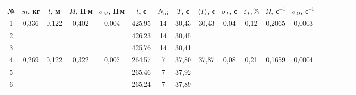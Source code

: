 \documentclass[a4paper,12pt]{article} %
\begin{document}
\begin{table}[H]
	\centering
	\begin{tabular}{|c|c|c|c|c|c|c|c|c|c|c|c|c|c|c|c|c|c|}
		\hline
		№  & $ m $, кг          & $ l $, м            & $ M $, Н$\cdot$м      & $ \sigma_M $, Н$\cdot$м             & $ t $, с & $ N_\text{об} $ & $ T $, с & $ \langle T \rangle $, с   & $ \sigma_T $, с          &  $ \varepsilon_T, \%$   & $ \Omega $, $ \text{с}^{-1} $ & $ \sigma_\Omega $, $ \text{с}^{-1} $ \\ \hline
	1  & \multirow{3}{*}{0,336} & \multirow{3}{*}{0,122} & \multirow{3}{*}{0,402} & \multirow{3}{*}{0,004} & 425,95            & 14             & 30,43              & \multirow{3}{*}{30,43} & \multirow{3}{*}{0,04} & \multirow{3}{*}{0,12}  & \multirow{3}{*}{0,2065}                   & \multirow{3}{*}{0,0003} \\ \cline{1-1} \cline{6-8}
	2  &                        &                        &                        &                        & 426,23            & 14             & 30,45              &                        &                       &                        &                                           &                         \\ \cline{1-1} \cline{6-8}
	3  &                        &                        &                        &                        & 425,76            & 14             & 30,41              &                        &                       &                        &                                           &                         \\ \hline \hline
	4  & \multirow{3}{*}{0,269} & \multirow{3}{*}{0,122} & \multirow{3}{*}{0,322} & \multirow{3}{*}{0,003} & 264,57            & 7              & 37,80              & \multirow{3}{*}{37,87} & \multirow{3}{*}{0,08} & \multirow{3}{*}{0,21}  & \multirow{3}{*}{0,1659}                   & \multirow{3}{*}{0,0004} \\ \cline{1-1} \cline{6-8}
	5  &                        &                        &                        &                        & 265,46            & 7              & 37,92              &                        &                       &                        &                                           &                         \\ \cline{1-1} \cline{6-8}
	6  &                        &                        &                        &                        & 265,24            & 7              & 37,89              &                        &                       &                        &                                           &                         \\ \hline \hline

\end{tabular}
\end{table}
\end{document}
